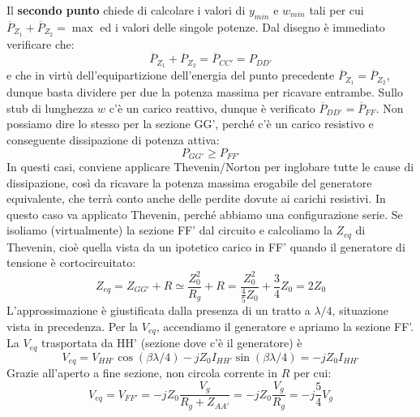 \documentclass{book}
\begin{document}
        Il \textbf{secondo punto} chiede di calcolare i valori di $y_{min}$ e $w_{min}$ tali per cui
        $\overline{P}_{Z_{1}}+\overline{P}_{Z_{2}}=\max$ ed i valori delle singole potenze. Dal disegno è immediato verificare che:
        \begin{equation}
            \overline{P}_{Z_{1}}+\overline{P}_{Z_{2}}=\overline{P}_{CC'} =P_{DD'}
        \end{equation}
        e che in virtù dell'equipartizione dell'energia del punto precedente $\overline{P}_{Z_{1}}=\overline{P}_{Z_{2}}$, dunque basta dividere per due 
        la potenza massima per ricavare entrambe. Sullo stub di lunghezza $w$ c'è un carico reattivo, dunque è verificato $\overline{P}_{DD'}=\overline{P}_{FF}$.
        Non possiamo dire lo stesso per la sezione GG', perché c'è un carico resistivo e conseguente dissipazione di potenza attiva:
        \begin{equation}
            P_{GG'}\geq P_{FF'}
        \end{equation}
        In questi casi, conviene applicare Thevenin/Norton per inglobare tutte le cause di dissipazione, così da ricavare la potenza 
        massima erogabile del generatore equivalente, che terrà conto anche delle perdite dovute ai carichi resistivi. In 
        questo caso va applicato Thevenin, perché abbiamo una configurazione serie. Se isoliamo (virtualmente) la sezione FF' dal circuito
        e calcoliamo la $Z_{eq}$ di Thevenin, cioè quella vista da un ipotetico carico in FF' quando il generatore di tensione è cortocircuitato:
        \begin{equation}
            Z_{eq}=Z_{GG'}+R \simeq \frac{Z_{0} ^{2}}{R_{g}}+R = \frac{Z^{2} _{0}}{\displaystyle \frac{4}{5}Z_{0}}+\frac{3}{4}Z_{0}=2Z_{0}
        \end{equation}
        L'approssimazione è giustificata dalla presenza di un tratto a $\lambda/4$, situazione vista in precedenza.
        Per la $V_{eq}$, accendiamo il generatore e apriamo la sezione FF'. La $V_{eq}$ trasportata da HH' (sezione dove c'è il generatore) è 
        \begin{equation}
            V_{eq}=V_{HH'}\cos(\beta \lambda /4)-jZ_{0}I_{HH'}\sin(\beta \lambda /4) = -jZ_{0}I_{HH'} 
        \end{equation}
        Grazie all'aperto a fine sezione, non circola corrente in $R$ per cui:
        \begin{equation}
            V_{eq}=V_{FF'}=-jZ_{0}\frac{V_{g}}{R_{g}+Z_{AA'}} = -jZ_{0}\frac{V_{g}}{R_{g}} = -j\frac{5}{4}V_{g}
        \end{equation}
\end{document}
